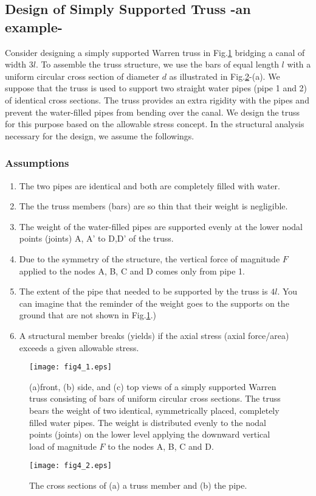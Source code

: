 \documentclass[10pt,a4j]{article}
\begin{document}
\subsection{Design of Simply Supported Truss -an example-}
Consider designing a simply supported Warren truss in Fig.\ref{fig:fig4_1} bridging 
a canal of width $3l$. To assemble the truss structure, we use the bars of equal 
length $l$ with a uniform circular cross section of diameter $d$ as illustrated in Fig.\ref{fig:fig4_2}-(a).
We suppose that the truss is used to support two straight water pipes (pipe 1 and 2) 
of identical cross sections. The truss provides an extra rigidity 
with the pipes and prevent the water-filled pipes from bending over the canal. 
We design the truss for this purpose based on the allowable stress concept.
In the structural analysis necessary for the design, we assume the followings.
\subsubsection{Assumptions}
\begin{enumerate}
\item
	The two pipes are identical and both are completely filled with water. 
\item
	The the truss members (bars) are so thin that their weight is negligible.
\item
	The weight of the water-filled pipes are supported evenly at the lower nodal 
		points (joints) A, A' to D,D' of the truss.
\item
	Due to the symmetry of the structure, the vertical force of magnitude 
	$F$ applied to the nodes A, B, C and D comes only from pipe 1.
\item
	The extent of the pipe that needed to be supported by the truss is $4l$. 
	You can imagine that the reminder of the weight goes to the supports on the 
	ground that are not shown in Fig.\ref{fig:fig4_1}.)
\item
	A structural member breaks (yields) if the axial stress (axial force/area) 
	exceeds a given allowable stress.
\end{enumerate}
\begin{figure}
	\begin{center}
	\texttt{[image: fig4\_1.eps]} 
	\end{center}
	\caption{
		(a)front, (b) side, and (c) top views of a simply supported Warren truss consisting 
		of bars of uniform circular cross sections. 
		The truss bears the weight of two identical, symmetrically placed, completely filled water pipes.
		The weight is distributed evenly to the nodal points (joints) on the lower level 
		applying the downward vertical load of magnitude $F$ to the nodes A, B, C and D.
	}
	\label{fig:fig4_1}
\end{figure}
\begin{figure}
	\begin{center}
	\texttt{[image: fig4\_2.eps]} 
	\end{center}
	\caption{
		The cross sections of (a) a truss member and (b) the pipe.  
	}
	\label{fig:fig4_2}
\end{figure}
\end{document}
